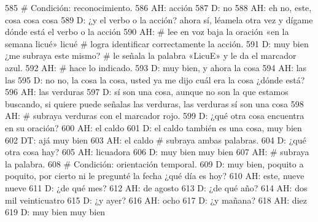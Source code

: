 585 # Condición: reconocimiento.
586 AH: acción
587 D: no
588 AH: eh no, este, cosa cosa cosa
589 D: ¿y el verbo o la acción? ahora sí, léamela otra vez y dígame dónde está el verbo o la acción
590 AH: # lee en voz baja la oración «en la semana licué» licué # logra identificar correctamente la acción.
591 D: muy bien ¿me subraya este mismo? # le señala la palabra «LicuE» y le da el marcador azul.
592 AH: # hace lo indicado.
593 D: muy bien, y ahora la cosa
594 AH: las las
595 D: no no, la cosa la cosa, usted ya me dijo cuál era la cosa ¿dónde está?
596 AH: las verduras
597 D: sí son una cosa, aunque no son la que estamos buscando, si quiere puede señalas las verduras, las verduras sí son una cosa
598 AH: # subraya verduras con el marcador rojo.
599 D: ¿qué otra cosa encuentra en su oración?
600 AH: el caldo
601 D: el caldo también es una cosa, muy bien
602 DT: ajá muy bien
603 AH: el caldo # subraya ambas palabras.
604 D: ¿qué otra cosa hay?
605 AH: licuadora
606 D: muy bien muy bien
607 AH: # subraya la palabra.
608 # Condición: orientación temporal.
609 D: muy bien, poquito a poquito, por cierto ni le pregunté la fecha ¿qué día es hoy?
610 AH: este, nueve nueve
611 D: ¿de qué mes?
612 AH: de agosto
613 D: ¿de qué año?
614 AH: dos mil veinticuatro
615 D: ¿y ayer?
616 AH: ocho
617 D: ¿y mañana?
618 AH: diez
619 D: muy bien muy bien
